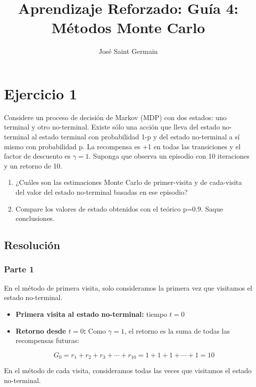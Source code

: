 \documentclass[12pt,a4paper]{article}
\title{Aprendizaje Reforzado: Guía 4: Métodos Monte Carlo}
\author{José Saint Germain}
\begin{document}
\maketitle

\section{Ejercicio 1}

Considere un proceso de decisión de Markov (MDP) con dos estados: uno terminal y otro no-terminal.
Existe sólo una acción que lleva del estado no-terminal al estado terminal con probabilidad 1-p y 
del estado no-terminal a sí mismo con probabilidad p. La recompensa es +1 en todas las
transiciones y el factor de descuento es $\gamma = 1$. Suponga que observa un episodio con
10 iteraciones y un retorno de 10.

\begin{enumerate}
    \item ¿Cuáles son las estimaciones Monte Carlo de primer-visita y de cada-visita
    del valor del estado no-terminal basadas en ese episodio?
    \item Compare los valores de estado obtenidos con el teórico p=0.9. Saque conclusiones.
\end{enumerate}

\subsection{Resolución}

\subsubsection{Parte 1}

En el método de primera visita, solo consideramos la primera vez que visitamos el estado no-terminal.

\begin{itemize}
    \item \textbf{Primera visita al estado no-terminal:} tiempo $t=0$
    \item \textbf{Retorno desde $t=0$:} Como $\gamma = 1$, el retorno es la suma de todas las recompensas futuras:
    
    $$G_0 = r_1 + r_2 + r_3 + \cdots + r_{10} = 1 + 1 + 1 + \cdots + 1 = 10$$
\end{itemize}

En el método de cada visita, consideramos todas las veces que visitamos el estado no-terminal.
\end{document}
